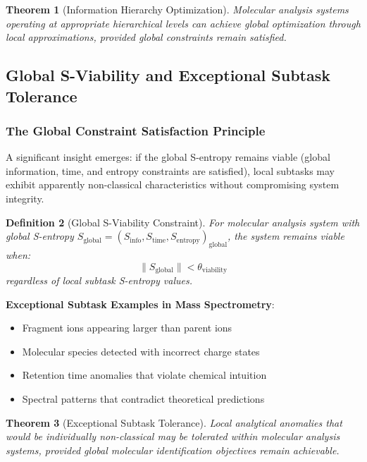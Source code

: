 \documentclass[11pt,a4paper]{article}
\newtheorem{theorem}{Theorem}[section]
\newtheorem{definition}[theorem]{Definition}
\theoremstyle{remark}
\begin{document}
\begin{theorem}[Information Hierarchy Optimization]
Molecular analysis systems operating at appropriate hierarchical levels can achieve global optimization through local approximations, provided global constraints remain satisfied.
\end{theorem}

\subsection{Global S-Viability and Exceptional Subtask Tolerance}

\subsubsection{The Global Constraint Satisfaction Principle}

A significant insight emerges: if the global S-entropy remains viable (global information, time, and entropy constraints are satisfied), local subtasks may exhibit apparently non-classical characteristics without compromising system integrity.

\begin{definition}[Global S-Viability Constraint]
For molecular analysis system with global S-entropy $S_{\text{global}} = (S_{\text{info}}, S_{\text{time}}, S_{\text{entropy}})_{\text{global}}$, the system remains viable when:
$$\|S_{\text{global}}\| < \theta_{\text{viability}}$$
regardless of local subtask S-entropy values.
\end{definition}

\textbf{Exceptional Subtask Examples in Mass Spectrometry}:
\begin{itemize}
\item Fragment ions appearing larger than parent ions
\item Molecular species detected with incorrect charge states
\item Retention time anomalies that violate chemical intuition
\item Spectral patterns that contradict theoretical predictions
\end{itemize}

\begin{theorem}[Exceptional Subtask Tolerance]
Local analytical anomalies that would be individually non-classical may be tolerated within molecular analysis systems, provided global molecular identification objectives remain achievable.
\end{theorem}
\end{document}
